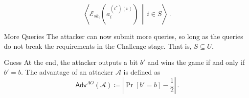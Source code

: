\documentclass[10pt,letterpaper,oneside,twocolumn,journal]{IEEEtran}
\theoremstyle{definition}
\theoremstyle{definition}
\theoremstyle{remark}
\begin{document}
\begin{LaTeXdescription}
    \begin{equation*}
        \left\langle\mathcal{E}_{sk_i}(a^{(t^*)(b)}_i)\,\middle|\,i\in S\right\rangle\,.
    \end{equation*}
    \item[More Queries] The attacker can now submit more queries, so long as the queries do not break the requirements in the Challenge stage. That is, $S \subseteq U$.
    \item[Guess] At the end, the attacker outputs a bit $b'$ and wins the game if and only if $b' = b$. The advantage of an attacker $\mathcal{A}$ is defined as
    \begin{equation*}
        \mathsf{Adv}^{AO}(\mathcal{A}) \coloneqq \left\lvert \Pr [b'=b] - \frac{1}{2}\right\rvert\,.
    \end{equation*} 
\end{LaTeXdescription}


\ifCLASSOPTIONcaptionsoff
  \newpage
\fi





\end{document}
